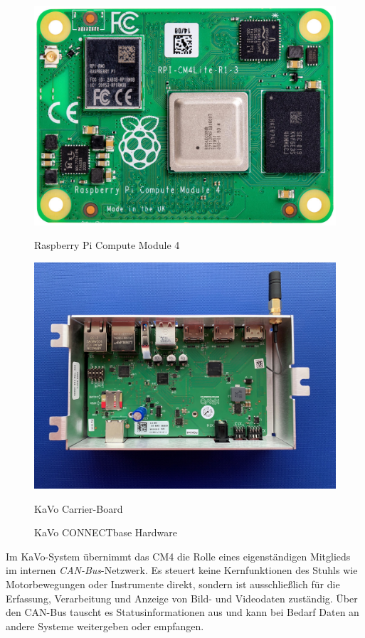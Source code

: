 \begin{figure}[H]
  \centering
  \begin{minipage}[b]{0.45\textwidth}
    \centering
    \includegraphics[width=\textwidth]{images/computemodule4.jpg}
    \caption*{Raspberry Pi Compute Module 4}
  \end{minipage}
  \hspace{0.05\textwidth}
  \begin{minipage}[b]{0.45\textwidth}
    \centering
    \includegraphics[width=\textwidth]{images/carrierboard.jpg}
    \caption*{KaVo Carrier-Board}
  \end{minipage}
  \caption{KaVo CONNECTbase Hardware}
  \label{fig:CONNECTbase Hardware}
\end{figure}
\vspace{1em}
Im KaVo-System übernimmt das CM4 die Rolle eines eigenständigen Mitglieds im internen \textit{CAN-Bus}-Netzwerk. Es steuert keine Kernfunktionen des Stuhls wie Motorbewegungen oder Instrumente direkt, sondern ist ausschließlich für die Erfassung, Verarbeitung und Anzeige von Bild- und Videodaten zuständig. Über den CAN-Bus tauscht es Statusinformationen aus und kann bei Bedarf Daten an andere Systeme weitergeben oder empfangen.

